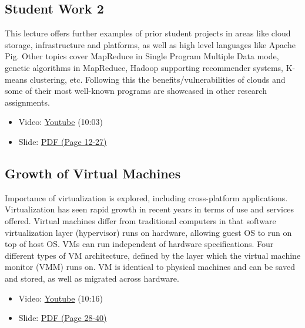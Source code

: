 \subsection{Student Work 2}\label{student-work-2}

This lecture offers further examples of prior student projects in areas
like cloud storage, infrastructure and platforms, as well as high level
languages like Apache Pig. Other topics cover MapReduce in Single
Program Multiple Data mode, genetic algorithms in MapReduce, Hadoop
supporting recommender systems, K-means clustering, etc. Following this
the benefits/vulnerabilities of clouds and some of their most well-known
programs are showcased in other research assignments.

\begin{itemize}
\tightlist
\item
  Video: \href{https://www.youtube.com/watch?v=DqaQ0kemmaw}{Youtube}
  (10:03)
\end{itemize}

\begin{itemize}
\tightlist
\item
  Slide:
  \href{https://drive.google.com/open?id=0B88HKpainTSfQU1uQmxZWHdWQ1k}{PDF
  (Page 12-27)}
\end{itemize}

\subsection{Growth of Virtual
Machines}\label{growth-of-virtual-machines}

Importance of virtualization is explored, including cross-platform
applications. Virtualization has seen rapid growth in recent years in
terms of use and services offered. Virtual machines differ from
traditional computers in that software virtualization layer (hypervisor)
runs on hardware, allowing guest OS to run on top of host OS. VMs can
run independent of hardware specifications. Four different types of VM
architecture, defined by the layer which the virtual machine monitor
(VMM) runs on. VM is identical to physical machines and can be saved and
stored, as well as migrated across hardware.

\begin{itemize}
\tightlist
\item
  Video: \href{https://www.youtube.com/watch?v=5oKoAPCXLws}{Youtube}
  (10:16)
\item
  Slide:
  \href{https://drive.google.com/open?id=0B88HKpainTSfQU1uQmxZWHdWQ1k}{PDF
  (Page 28-40)}
\end{itemize}

